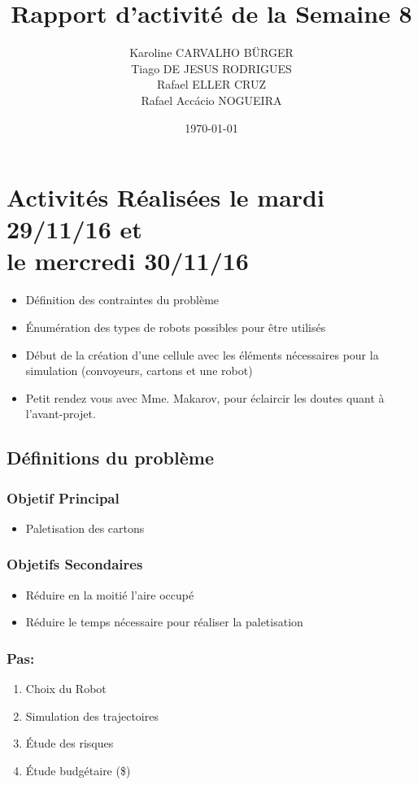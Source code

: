 \documentclass[11pt,a4paper,onecolumn]{articlewithlogo}
\title{Rapport d'activité de la Semaine 8}
\author{Karoline CARVALHO BÜRGER\\ Tiago DE JESUS RODRIGUES\\  Rafael ELLER CRUZ \\Rafael Accácio NOGUEIRA }
\date{\today}
\begin{document}
\maketitle
\section{Activités Réalisées le mardi 29/11/16 et \\ le mercredi 30/11/16  }
\begin{itemize}
	\renewcommand\labelitemi{$\circ$}
	\item Définition des contraintes du problème
	\item Énumération des types de robots possibles pour être utilisés
	\item Début de la création d'une cellule avec les éléments nécessaires pour la simulation (convoyeurs, cartons et une robot) 
	\item Petit rendez vous avec Mme. Makarov, pour éclaircir les doutes quant à l'avant-projet.
\end{itemize}

\newpage
\subsection{Définitions du problème}
\subsubsection{Objetif Principal}
\begin{itemize}
	\renewcommand\labelitemi{$\circ$}
	\item Paletisation des cartons
	
\end{itemize}
\subsubsection{Objetifs Secondaires}
\begin{itemize}
	\renewcommand\labelitemi{$\circ$}
	\item Réduire en la moitié l'aire occupé 
	\item Réduire le temps nécessaire pour réaliser la paletisation 
\end{itemize}

\subsubsection{Pas:}
\begin{enumerate}
	\item Choix du Robot
	\item Simulation des trajectoires
	\item Étude des risques
	\item Étude budgétaire (\$)
\end{enumerate}
\end{document}
